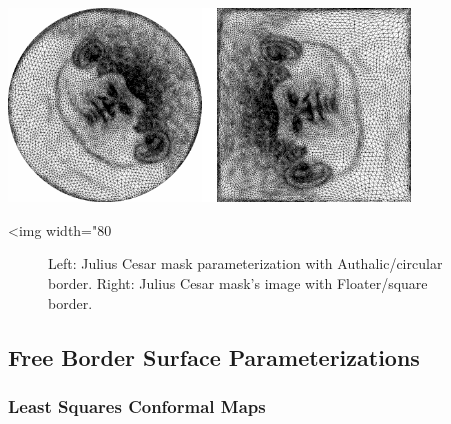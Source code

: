   \\
  \\
  \\
  \\

\begin{center}
    \label{Surface_mesh_parameterization-fig-circular_border}
    \begin{ccTexOnly}
        \includegraphics[width=0.80\textwidth]{Surface_mesh_parameterization/border}
    \end{ccTexOnly}
    \begin{ccHtmlOnly}
        <img width="80%
    \end{ccHtmlOnly}
    \begin{figure}[ht]
        \caption{Left: Julius Cesar mask parameterization with
                 Authalic/circular border. Right: Julius Cesar mask's
                 image with Floater/square border.}
    \end{figure}
\end{center}



\subsection{Free Border Surface Parameterizations}

\subsubsection{Least Squares Conformal Maps}

  \\

